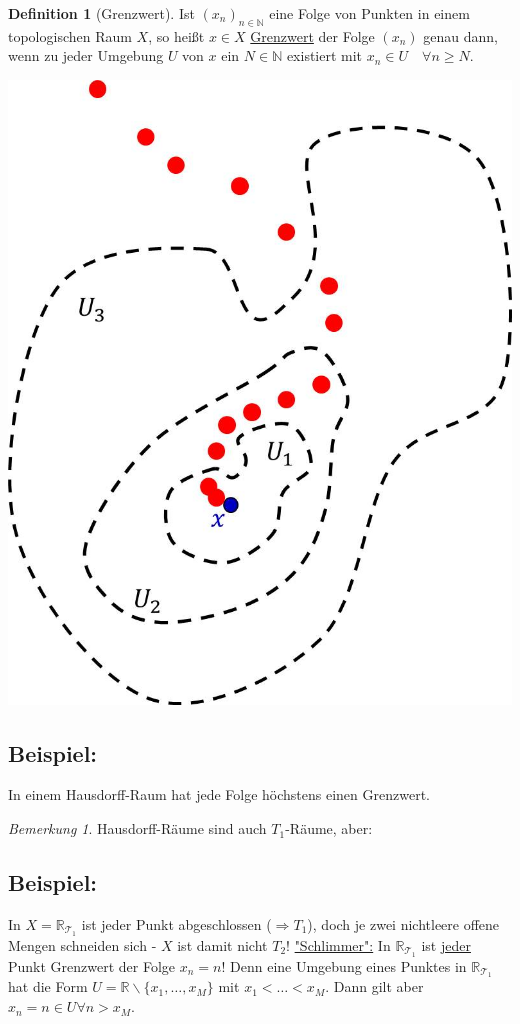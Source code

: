 \documentclass[a4paper,11pt,notitlepage]{report}
\theoremstyle{remark}
\newtheorem{remark}{Bemerkung}[chapter]
\theoremstyle{definition}
\newtheorem{definition}{Definition}[chapter]
\newcommand{\R}{{\ensuremath{\mathbb{R}}}}
\newcommand{\N}{{\ensuremath{\mathbb{N}}}}
\newenvironment{bsp}[1]
{
\setlength{\fboxsep}{10pt}
\subsection*{Beispiel: #1}
\begin{upshape}
}
{
\end{upshape}
}
\begin{document}
\begin{definition}[Grenzwert]
Ist $(x_n)_{n \in \N}$ eine Folge von Punkten in einem topologischen Raum $X$, so heißt $x \in X$ \underline{Grenzwert} der Folge $(x_n)$ genau dann, wenn zu jeder Umgebung $U$ von $x$ ein $N \in \N$ existiert mit $x_n \in U \quad \forall n \geq N$. 
\newline
\end{definition}
\begin{center}
	\includegraphics[scale=0.5]{images/Grenzwert.jpg}
\end{center}

\begin{bsp}{}
In einem Hausdorff-Raum hat jede Folge höchstens einen Grenzwert.
\end{bsp}

\begin{remark}
Hausdorff-Räume sind auch $T_1$-Räume, aber:
\end{remark}

\begin{bsp}{}
	In $X=\R_{\mathcal{T}_1}$ ist jeder Punkt abgeschlossen ($\Rightarrow T_1$), doch je zwei nichtleere offene Mengen schneiden sich - $X$ ist damit nicht $T_2$!
	\underline{"Schlimmer":} In $\R_{\mathcal{T}_1}$ ist \underline{jeder} Punkt Grenzwert der Folge $x_n = n$!
	Denn eine Umgebung eines Punktes in $\R_{\mathcal{T}_1}$ hat die Form $U = \R \backslash \{x_1, \ldots, x_M\}$ mit $x_1 < \ldots < x_M$. Dann gilt aber $x_n = n \in U \forall n > x_M$.
\end{bsp}
\end{document}
